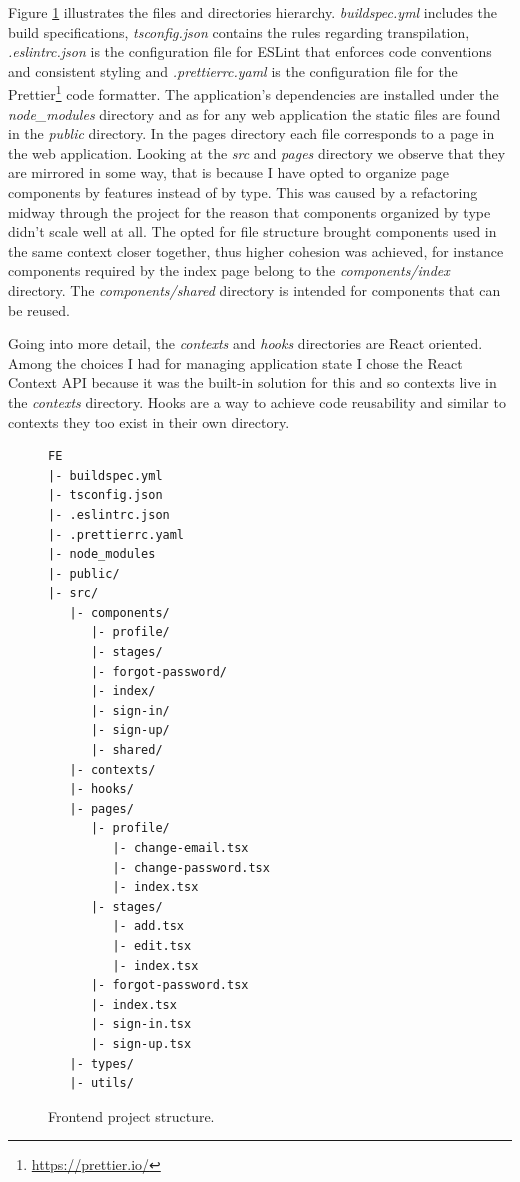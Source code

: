 Figure \ref{figure:frontend-project-structure} illustrates the files and directories hierarchy. \textit{buildspec.yml} includes the build specifications, \textit{tsconfig.json} contains the rules regarding transpilation, \textit{.eslintrc.json} is the configuration file for ESLint that enforces code conventions and consistent styling and \textit{.prettierrc.yaml} is the configuration file for the Prettier\footnote{\href{https://prettier.io/}{https://prettier.io/}} code formatter. The application's dependencies are installed under the \textit{node\_modules} directory and as for any web application the static files are found in the \textit{public} directory. In the pages directory each file corresponds to a page in the web application. Looking at the \textit{src} and \textit{pages} directory we observe that they are mirrored in some way, that is because I have opted to organize page components by features instead of by type. This was caused by a refactoring midway through the project for the reason that components organized by type didn't scale well at all. The opted for file structure brought components used in the same context closer together, thus higher cohesion was achieved, for instance components required by the index page belong to the \textit{components/index} directory. The \textit{components/shared} directory is intended for components that can be reused. 

Going into more detail, the \textit{contexts} and \textit{hooks} directories are React oriented. Among the choices I had for managing application state I chose the React Context API because it was the built-in solution for this and so contexts live in the \textit{contexts} directory. Hooks are a way to achieve code reusability and similar to contexts they too exist in their own directory.

\begin{figure}[H]
\begin{verbatim}
FE
|- buildspec.yml
|- tsconfig.json
|- .eslintrc.json
|- .prettierrc.yaml
|- node_modules
|- public/
|- src/
   |- components/
      |- profile/
      |- stages/
      |- forgot-password/
      |- index/
      |- sign-in/
      |- sign-up/
      |- shared/
   |- contexts/
   |- hooks/
   |- pages/
   	  |- profile/
   	     |- change-email.tsx
   	     |- change-password.tsx
   	     |- index.tsx
   	  |- stages/
   	     |- add.tsx
   	     |- edit.tsx
   	     |- index.tsx
   	  |- forgot-password.tsx
   	  |- index.tsx
   	  |- sign-in.tsx
   	  |- sign-up.tsx
   |- types/
   |- utils/
\end{verbatim}
\caption{Frontend project structure.}
\label{figure:frontend-project-structure}
\end{figure}

